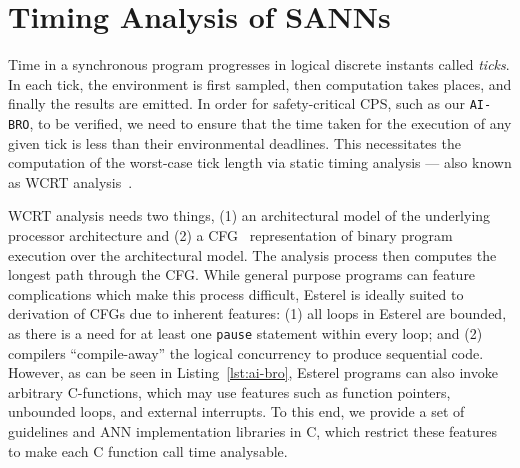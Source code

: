 \section{Timing Analysis of \acp{SANN}}
\label{sec:wcrt}

Time in a synchronous program progresses in logical discrete instants called \emph{ticks}. 
In each tick, the environment is first sampled, then computation takes places, and finally the results are emitted.
In order for safety-critical \ac{CPS}, such as our \texttt{AI-BRO}, to be verified, we need to ensure that the time taken for the execution of any given tick is less than their environmental deadlines.
This necessitates the computation of the worst-case tick length via static timing analysis --- also known as \acf{WCRT} analysis~\cite{roop2009tight}.

\ac{WCRT} analysis needs two things, (1) an architectural model of the
underlying processor architecture and (2) a \acf{CFG}~\cite{wilhelm2008worst}  representation of
binary program execution over the architectural model. The analysis
process then computes the longest path through the \ac{CFG}.
While general purpose programs can feature complications which make this process difficult, Esterel is ideally suited to derivation of \acp{CFG} due to inherent features:  (1)
all loops in Esterel are bounded, as there is a need for at least one \texttt{pause} statement
within every loop; and (2) compilers ``compile-away'' the logical
concurrency to produce sequential code. However, as can be seen in
Listing~\ref{lst:ai-bro}, 
Esterel programs can also invoke arbitrary C-functions, which may use
features such as function pointers, unbounded loops, and external interrupts. 
To this end, we provide a set of guidelines and \ac{ANN}
implementation libraries in C,
which restrict these features to make each C function call time
analysable. 

